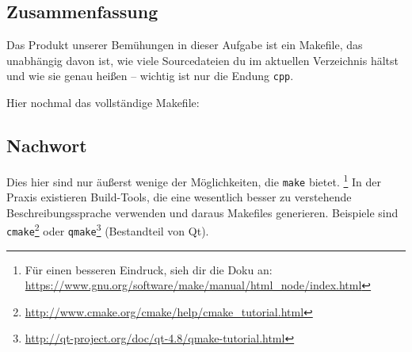 \subsection{Zusammenfassung}

Das Produkt unserer Bemühungen in dieser Aufgabe ist ein Makefile, das unabhängig davon ist, wie viele Sourcedateien du im aktuellen Verzeichnis hältst und wie sie genau heißen -- wichtig ist nur die Endung \lstinline{cpp}.

Hier nochmal das vollständige Makefile:

\subsection{Nachwort}

Dies hier sind nur äußerst wenige der Möglichkeiten, die \texttt{make} bietet.%
\footnote{Für einen besseren Eindruck, sieh dir die Doku an: \url{https://www.gnu.org/software/make/manual/html_node/index.html}}
%
In der Praxis existieren Build-Tools, die eine wesentlich besser zu verstehende Beschreibungssprache verwenden und daraus Makefiles generieren.
Beispiele sind \texttt{cmake}\footnote{\url{http://www.cmake.org/cmake/help/cmake_tutorial.html}} oder \texttt{qmake}\footnote{\url{http://qt-project.org/doc/qt-4.8/qmake-tutorial.html}} (Bestandteil von Qt).

